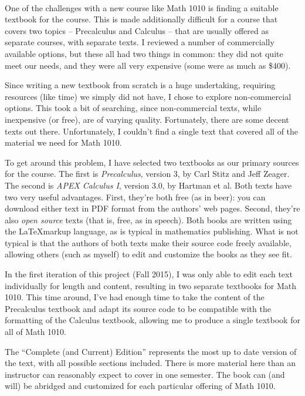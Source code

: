\thispagestyle{empty}
\Huge
{}\\
\normalsize

One of the challenges with a new course like Math 1010 is finding a suitable textbook for the course. This is made additionally difficult for a course that covers two topics -- Precalculus and Calculus -- that are usually offered as separate courses, with separate texts. I reviewed a number of commercially available options, but these all had two things in common: they did not quite meet our needs, and they were all very expensive (some were as much as \$400).

Since writing a new textbook from scratch is a huge undertaking, requiring resources (like time) we simply did not have, I chose to explore non-commercial options. This took a bit of searching, since non-commercial texts, while inexpensive (or free), are of varying quality. Fortunately, there are some decent texts out there. Unfortunately, I couldn't find a single text that covered all of the material we need for Math 1010.

To get around this problem, I have selected two textbooks as our primary sources for the course. The first is \textit{Precalculus}, version 3, by Carl Stitz and Jeff Zeager. The second is \textit{APEX Calculus I},  version 3.0, by Hartman et al. Both texts have two very useful advantages. First, they're both free (as in beer): you can download either text in PDF format from the authors' web pages. Second, they're also \textit{open source} texts (that is, free, as in speech). Both books are written using the \LaTeX markup language, as is typical in mathematics publishing. What is not typical is that the authors of both texts make their source code freely available, allowing others (such as myself) to edit and customize the books as they see fit.

In the first iteration of this project (Fall 2015), I was only able to edit each text individually for length and content, resulting in two separate textbooks for Math 1010. This time around, I've had enough time to take the content of the Precalculus textbook and adapt its source code to be compatible with the formatting of the Calculus textbook, allowing me to produce a single textbook for all of Math 1010.

The ``Complete (and Current) Edition'' represents the most up to date version of the text, with all possible sections included. There is more material here than an instructor can reasonably expect to cover in one semester. The book can (and will) be abridged and customized for each particular offering of Math 1010. 

